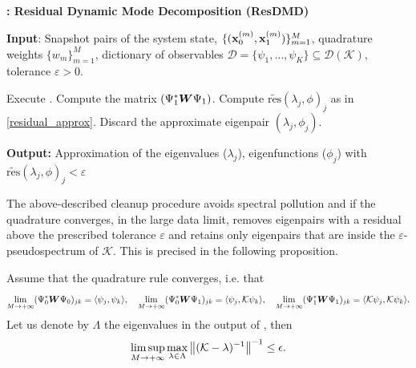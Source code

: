 \begin{algorithm}
\caption{\textbf{: Residual Dynamic Mode Decomposition (ResDMD)}}
\label{alg_resdmd}
\textbf{Input}: Snapshot pairs of the system state, $\{(\vb{x}_0^{(m)}, \vb{x}_1^{(m)})\}_{m = 1}^M$, quadrature weights $\{w_m\}_{m = 1}^M$, dictionary of observables $\mathcal{D} = \{\psi_1, \dots, \psi_K\} \subseteq \mathcal{D}(\mathcal{K})$, tolerance $\varepsilon > 0$.
\begin{algorithmic}[1]
\State Execute .
\State Compute the matrix $(\Psi_1^*\vb*{W}\Psi_1)$.
    \State Compute $\widetilde{\mathrm{res}}(\lambda_j, \phi)_j$ as in \eqref{residual_approx}.
        \State Discard the approximate eigenpair $(\lambda_j,\phi_j)$.
    \EndIf
\EndFor
\end{algorithmic}
\textbf{Output:} Approximation of the eigenvalues ($\lambda_j$), eigenfunctions ($\phi_j$) with $\widetilde{\mathrm{res}}(\lambda_j, \phi)_j < \varepsilon$
\end{algorithm}

The above-described cleanup procedure avoids spectral pollution and if the quadrature converges, in the large data limit, removes eigenpairs with a residual above the prescribed tolerance $\varepsilon$ and retains only eigenpairs that are inside the $\varepsilon$-pseudospectrum of $\mathcal{K}$. This is precised in the following proposition.
\begin{prop}
Assume that the quadrature rule converges, i.e. that
\begin{equation*}
    \lim_{M\to+\infty}(\Psi_0^*\vb*{W}\Psi_0)_{jk} = \langle \psi_j, \psi_k \rangle, \quad
    \lim_{M\to+\infty}(\Psi_0^*\vb*{W}\Psi_1)_{jk} = \langle \psi_j, \mathcal{K}\psi_k \rangle, \quad
    \lim_{M\to+\infty}(\Psi_1^*\vb*{W}\Psi_1)_{jk} = \langle \mathcal{K}\psi_j, \mathcal{K}\psi_k \rangle.
\end{equation*}
Let us denote by $\Lambda$ the eigenvalues in the output of , then
\begin{equation}
    \limsup_{M\to+\infty} \max_{\lambda\in\Lambda}\norm{(\mathcal{K} - \lambda)^{-1}}^{-1} \leq \epsilon.
\end{equation}
\end{prop}

